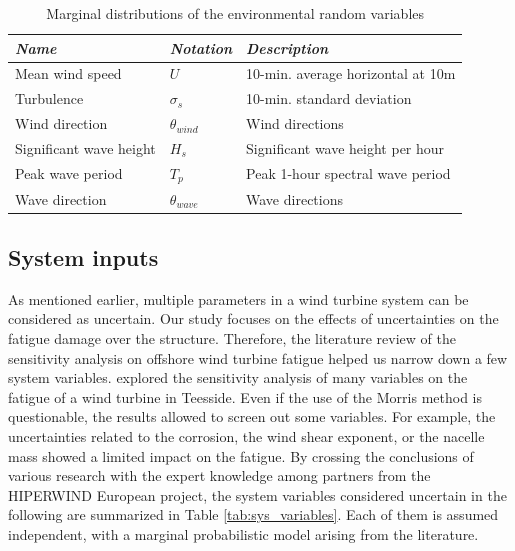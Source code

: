 \begin{table}[h!]
    \centering
    \begin{tabular}{ l l l}
        \hline
        {\it Name} & {\it Notation} & {\it Description}\\
        \hline
        Mean wind speed & $U$ & 10-min. average horizontal at 10m\\
        Turbulence & $\sigma_s $ & 10-min.  standard deviation \\
        Wind direction & $\theta_{wind} $ & Wind directions\\
        Significant wave height & $H_s $  & Significant wave height per hour\\
        Peak wave period & $T_p $ & Peak 1-hour spectral wave period \\
        Wave direction & $\theta_{wave} $ & Wave directions\\
        \hline
    \end{tabular}
    \caption{Marginal distributions of the environmental random variables}
    \label{tab:envi_variables}
\end{table}

\subsection{System inputs}
As mentioned earlier, multiple parameters in a wind turbine system can be considered as uncertain. 
Our study focuses on the effects of uncertainties on the fatigue damage over the structure. 
Therefore, the literature review of the sensitivity analysis on offshore wind turbine fatigue helped us narrow down a few system variables. 
\citet{petrovska_2022} explored the sensitivity analysis of many variables on the fatigue of a wind turbine in Teesside. 
Even if the use of the Morris method is questionable, the results allowed to screen out some variables. 
For example, the uncertainties related to the corrosion, the wind shear exponent, or the nacelle mass showed a limited impact on the fatigue.     
By crossing the conclusions of various research with the expert knowledge among partners from the HIPERWIND European project, the system variables considered uncertain in the following are summarized in Table \ref{tab:sys_variables}. 
Each of them is assumed independent, with a marginal probabilistic model arising from the literature. 


